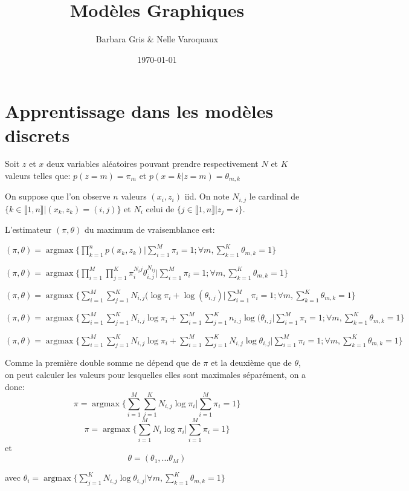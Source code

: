 \documentclass{article}
\date{\today}
\title{Modèles Graphiques}
\author{Barbara Gris \& Nelle Varoquaux}
\DeclareMathOperator{\argmax}{argmax}
\begin{document}
\maketitle
\tableofcontents{}
\vfill \eject


\section{Apprentissage dans les modèles discrets}
Soit $z$ et $x$ deux variables aléatoires pouvant prendre
respectivement $N$ et $K$ valeurs telles que: $p(z= m) =
\pi_m$ et $p(x=k|z=m) = \theta_{m,k}$

On suppose que l'on observe $n$ valeurs $(x_i, z_i)$ iid. On note 
$N_{i, j}$ le cardinal de 
$\{k \in \llbracket 1, n \rrbracket | (x_{k}, z_k) = (i, j)\}$ et $N_i$ celui
de $\{j \in \llbracket 1, n \rrbracket | z_j = i \}$.

L'estimateur $(\pi, \theta)$ du maximum de vraisemblance est:

$(\pi, \theta) = \argmax \{ \prod_{k=1}^n p(x_k, z_k) | \sum_{i=1}^{M}\pi_{i}=1; \forall m,\sum_{k=1}^{K}\theta_{m,k}=1 \}$

$(\pi, \theta) = \argmax \{ \prod_{i=1}^M \prod_{j=1}^K \pi_i^{N_ij} \theta_{i,j}^{N_{ij}} | \sum_{i=1}^{M}\pi_{i}=1; \forall m,\sum_{k=1}^{K}\theta_{m,k}=1 \}$

$(\pi, \theta) = \argmax \{\sum_{i=1}^{M} \sum_{j=1}^K N_{i,j}(\log\pi_{i} + \log(\theta_{i,j})| \sum_{i=1}^{M}\pi_{i}=1; \forall m,\sum_{k=1}^{K}\theta_{m,k}=1 \}$

$(\pi, \theta) = \argmax \{\sum_{i=1}^{M} \sum_{j=1}^K N_{i,j}\log\pi_{i} + \sum_{i=1}^{M} \sum_{j=1}^K n_{i,j}\log(\theta_{i,j}| \sum_{i=1}^{M}\pi_{i}=1; \forall m,\sum_{k=1}^{K}\theta_{m,k}=1 \}$

$(\pi, \theta) = \argmax \{\sum_{i=1}^{M} \sum_{j=1}^K N_{i,j}\log\pi_{i} + \sum_{i=1}^{M} \sum_{j=1}^K N_{i,j}\log\theta_{i,j} | \sum_{i=1}^{M}\pi_{i}=1; \forall m,\sum_{k=1}^{K}\theta_{m,k}=1 \}$

Comme la première double somme ne dépend que de $\pi$ et la deuxième que de $\theta$, on peut calculer les valeurs pour lesquelles elles sont maximales séparément, on a donc:
$$\pi = \argmax \{\sum_{i=1}^{M} \sum_{j=1}^K N_{i,j} \log\pi_i| \sum_{i=1}^{M}\pi_{i}=1 \}$$
$$\pi=\argmax \{\sum_{i=1}^{M}  N_{i} \log\pi_i| \sum_{i=1}^{M}\pi_{i}=1 \}$$
et
$$\theta = (\theta_1, ... \theta_M)$$

avec $\theta_i = \argmax \{ \sum_{j=1}^K N_{i,j}\log\theta_{i,j}|\forall m,\sum_{k=1}^{K}\theta_{m,k}=1 \}$
\end{document}
